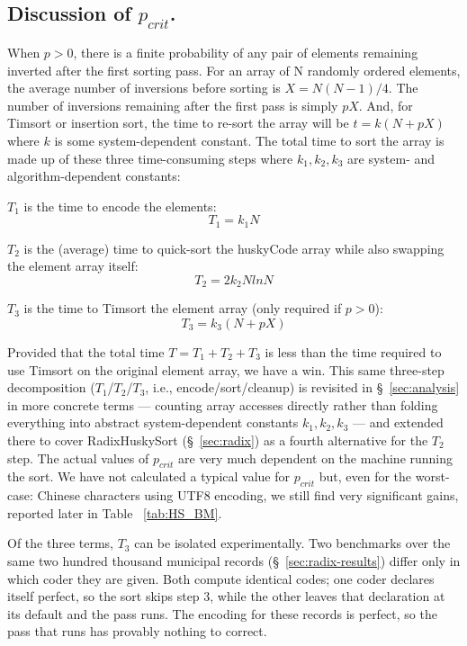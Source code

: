 \documentclass[twoside,leqno,twocolumn]{article}
\begin{document}
\subsection{Discussion of \texorpdfstring{$p_{crit}$}{p\_crit}.}
\label{sec:pcrit}
When $p > 0$, there is a finite probability of any pair of elements remaining inverted after the first sorting pass.
For an array of N randomly ordered elements, the average number of inversions before sorting is $X = N (N -1 ) / 4$.
The number of inversions remaining after the first pass is simply $p X$.
And, for Timsort or insertion sort, the time to re-sort the array will be $t = k (N + p X)$ where $k$ is some system-dependent constant.
The total time to sort the array is made up of these three time-consuming steps where $k_1, k_2, k_3$ are system- and algorithm-dependent constants:

\begin{steps}
 \item{} $T_1$ is the time to encode the elements:
\[T_1 = k_1 N\]
\item{}  $T_2$ is the (average) time to quick-sort the huskyCode array while also swapping the element array itself:
\[T_2 = 2 k_2 N ln N\]
\item{}  $T_3$  is the time to Timsort the element array (only required if $p>0$):
 \[T_3 = k_3 (N + p X)\]
\end{steps}
Provided that the total time $T = T_1 + T_2 + T_3$ is less than the time required to use Timsort on the original element array, we have a win.
This same three-step decomposition ($T_1$/$T_2$/$T_3$, i.e., encode/sort/cleanup) is revisited in \S~\ref{sec:analysis}
in more concrete terms —
counting array accesses directly rather than folding everything into abstract system-dependent constants $k_1, k_2, k_3$ —
and extended there to cover RadixHuskySort (\S~\ref{sec:radix}) as a fourth alternative for the $T_2$ step.
The actual values of $p_{crit}$ are very much dependent on the machine running the sort.
We have not calculated a typical value for $p_{crit}$ but, even for the worst-case:
Chinese characters using UTF8 encoding, we still find very significant gains, reported later in Table ~\ref{tab:HS_BM}.

Of the three terms, $T_3$ can be isolated experimentally.
Two benchmarks over the same two hundred thousand municipal records (\S~\ref{sec:radix-results})
differ only in which coder they are given.
Both compute identical codes; one coder declares itself perfect, so the sort skips step 3,
while the other leaves that declaration at its default and the pass runs.
The encoding for these records is perfect, so the pass that runs has provably nothing to correct.
\end{document}
